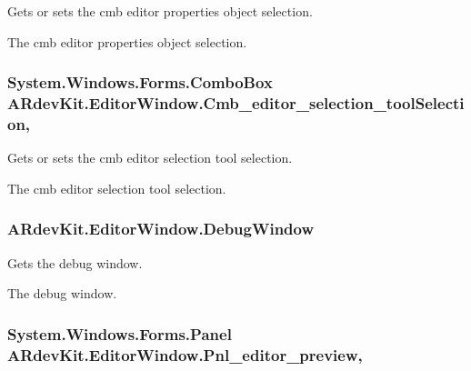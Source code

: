 Gets or sets the cmb editor properties object selection. 

The cmb editor properties object selection. \hypertarget{class_a_rdev_kit_1_1_editor_window_a0937e4db376a67530e488c174d512925}{
\subsubsection[{Cmb\-\_\-editor\-\_\-selection\-\_\-tool\-Selection}]{\setlength{\rightskip}{0pt plus 5cm}System.\-Windows.\-Forms.\-Combo\-Box A\-Rdev\-Kit.\-Editor\-Window.\-Cmb\-\_\-editor\-\_\-selection\-\_\-tool\-Selection\hspace{0.3cm}{\ttfamily [get]}, {\ttfamily [set]}}}\label{class_a_rdev_kit_1_1_editor_window_a0937e4db376a67530e488c174d512925}


Gets or sets the cmb editor selection tool selection. 

The cmb editor selection tool selection. \hypertarget{class_a_rdev_kit_1_1_editor_window_a680468ae45b84228fb668d8dbb0aba48}{
\subsubsection[{Debug\-Window}]{ A\-Rdev\-Kit.\-Editor\-Window.\-Debug\-Window\hspace{0.3cm}{\ttfamily [get]}}}\label{class_a_rdev_kit_1_1_editor_window_a680468ae45b84228fb668d8dbb0aba48}


Gets the debug window. 

The debug window. \hypertarget{class_a_rdev_kit_1_1_editor_window_a63d02d43b7dfe8841d6e1204948ecb17}{
\subsubsection[{Pnl\-\_\-editor\-\_\-preview}]{\setlength{\rightskip}{0pt plus 5cm}System.\-Windows.\-Forms.\-Panel A\-Rdev\-Kit.\-Editor\-Window.\-Pnl\-\_\-editor\-\_\-preview\hspace{0.3cm}{\ttfamily [get]}, {\ttfamily [set]}}}\label{class_a_rdev_kit_1_1_editor_window_a63d02d43b7dfe8841d6e1204948ecb17}


